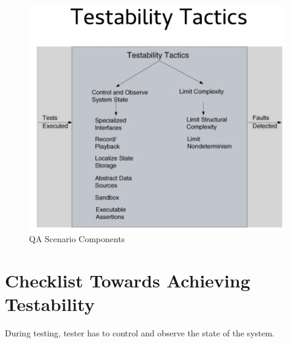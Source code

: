 \documentclass[a4paper]{report}
\begin{document}
\begin{figure}[h]
\centering 
\includegraphics[scale=0.5]{aimages/testtactics.png}
\caption{\label{tab:widgets} QA Scenario Components}
\end{figure}


\section{Checklist Towards Achieving Testability}
During testing, tester has to control and observe the state of the system.
\end{document}
